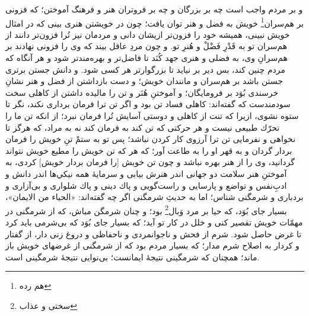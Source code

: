 و بر مردم واجب است چه بر بزرگان و چه بر فروتران هنر و فرهنگ آموختن؛ كه فزونى بر هم‌سران\footnote{هم رده} خويش به فضل و هنر توان يافت؛ چون در خويشتن هنرى بينى كه در امثال خويش نبينى، هميشه خود را فزون‌تر ازيشان دانى و مردمان نيز تُرا فزون‌تر دانند از هم‌سران تو به قَدْرِ فَضْلْ و هُنرِ تو. و چون مردِ عاقل بيند كه وى را فزونى نهادند بر هم‌سرانِ وى، به فضلى و هنرى جهد كُنَد تا فاضل‌تر و بهره‌مندتر شود و هر آنگاه كه مردم چنين كند، بس دير بر نيايد تا بزرگوارتر هر كسى شود. و دانش جستن برترى جستن باشد بر هم‌سران و مانندان خويش؛ و دست بازداشتن از فضل و هنر نشانِ خرسندى  بُوَد بر فرومايگان؛ و آموختنِ هُنَر و تن را ماليده داشتن از كاهلى سخت سودمندست كه گفته‌اند: كاهلى فساد تن بود و اگر تن ترا فرمان بردارى نكند، نگر تا ستوه نشوى، ازيرا كه تنت از كاهلى و دوستى آسايش تُرا فرمان نبرد؛ از انكه تن ما را تحرّك طبيعى نيست و هر حركتى كه تن كند به فرمان كند نه به مراد، كه هرگز تا نخواهى و نفرمايى تن ترا آرزوى كار كردن نباشد؛ پس تو به ستمْ تنِ خويش را فرمان بردار گردان و به قهر او را به طاعت آور؛ كه هر كه تن خويش را مطيع خويش نتواند گردانيد، وى را از هنر بهره نباشد و چون تن خويش [را فرمان بردار خويش] كردى، به آموختنِ هنر سلامت دو جهانى اندر هنرش بيابى و سرمايۀ همه نيكي‌ها اندر دانش و ادبِ‌نفس و تواضع و پارسايى و راست‌گويى و پاك دينى و پاك شلوارى و بى‌آزارى و بردبارى و شرمگنى‌‌ شناس؛ اما به حدیثِ شرمگنى اگر چه گفته‌اند: «الحياء من الايمان»، بسيار جاى بُوَد، كه حيا بر مرد وَبال\footnote{سختی و عذاب} بود؛ و چنان شرمگن مباش، كه از شرمگنى در مهمّات خويش تقصير كنى و خلل در كار تو آيد؛ كه بسيار جاى بُوَد كه بى‌شرمى بايد كرد تا غرض حاصل شود. شرم از فحش و ناجوانمردى و ناحفاظى و دروغ زنى دار، از گفتار و كردار به اصلاح شرم مدار؛ كه بسيار مردم بود كه از شرمگنى از غرضهاى خويش باز ماند؛ همچنان كه شرمگينى نتيجۀ ايمانست؛ بى‌نوايى نتيجۀ شرمگينى است.

